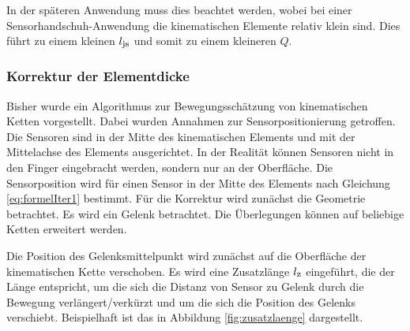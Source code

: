 In der späteren Anwendung muss dies beachtet werden, wobei bei einer Sensorhandschuh-Anwendung die kinematischen Elemente relativ klein sind. Dies führt zu einem kleinen $l_{\textrm{\footnotesize{js}}}$ und somit zu einem kleineren $Q$.

\subsubsection{Korrektur der Elementdicke}
Bisher wurde ein Algorithmus zur Bewegungsschätzung von kinematischen Ketten vorgestellt. Dabei wurden Annahmen zur Sensorpositionierung getroffen. Die Sensoren sind in der Mitte des kinematischen Elements und mit der Mittelachse des Elements ausgerichtet. In der Realität können Sensoren nicht in den Finger eingebracht werden, sondern nur an der Oberfläche. Die Sensorposition wird für einen Sensor in der Mitte des Elements nach Gleichung \ref{eq:formelIter1} bestimmt. Für die Korrektur wird zunächst die Geometrie betrachtet. Es wird ein Gelenk betrachtet. Die Überlegungen können auf beliebige Ketten erweitert werden.

Die Position des Gelenksmittelpunkt wird zunächst auf die Oberfläche der kinematischen Kette verschoben. Es wird eine Zusatzlänge $l_{\textrm{\footnotesize{z}}}$ eingeführt, die der Länge entspricht, um die sich die Distanz von Sensor zu Gelenk durch die Bewegung verlängert/verkürzt und um die sich die Position des Gelenks verschiebt. Beispielhaft ist das in Abbildung \ref{fig:zusatzlaenge} dargestellt.

